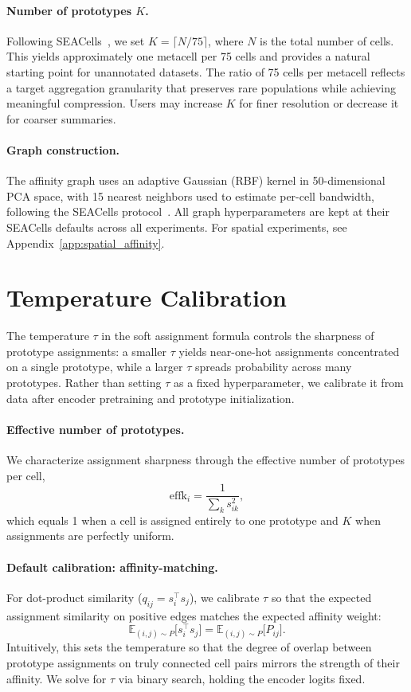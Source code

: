 \paragraph{Number of prototypes $K$.}
Following SEACells~\citep{seacells}, we set $K = \lceil N / 75 \rceil$, where $N$ is the total number of cells.
This yields approximately one metacell per 75 cells and provides a natural starting point for unannotated datasets.
The ratio of 75 cells per metacell reflects a target aggregation granularity that preserves rare populations while achieving meaningful compression.
Users may increase $K$ for finer resolution or decrease it for coarser summaries.

\paragraph{Graph construction.}
The affinity graph uses an adaptive Gaussian (RBF) kernel in 50-dimensional PCA space, with 15 nearest neighbors used to estimate per-cell bandwidth, following the SEACells protocol~\citep{seacells}.
All graph hyperparameters are kept at their SEACells defaults across all experiments.
For spatial experiments, see Appendix~\ref{app:spatial_affinity}.

\section{Temperature Calibration}
\label{app:calibration}

The temperature $\tau$ in the soft assignment formula controls the sharpness of prototype assignments: a smaller $\tau$ yields near-one-hot assignments concentrated on a single prototype, while a larger $\tau$ spreads probability across many prototypes. Rather than setting $\tau$ as a fixed hyperparameter, we calibrate it from data after encoder pretraining and prototype initialization.

\paragraph{Effective number of prototypes.}
We characterize assignment sharpness through the effective number of prototypes per cell,
\[
\mathrm{effk}_i = \frac{1}{\displaystyle\sum_{k} s_{ik}^2},
\]
which equals 1 when a cell is assigned entirely to one prototype and $K$ when assignments are perfectly uniform.

\paragraph{Default calibration: affinity-matching.}
For dot-product similarity ($q_{ij} = s_i^\top s_j$), we calibrate $\tau$ so that the expected assignment similarity on positive edges matches the expected affinity weight:
\[
\mathbb{E}_{(i,j) \sim P}\bigl[s_i^\top s_j\bigr] = \mathbb{E}_{(i,j) \sim P}\bigl[P_{ij}\bigr].
\]
Intuitively, this sets the temperature so that the degree of overlap between prototype assignments on truly connected cell pairs mirrors the strength of their affinity. We solve for $\tau$ via binary search, holding the encoder logits fixed.

